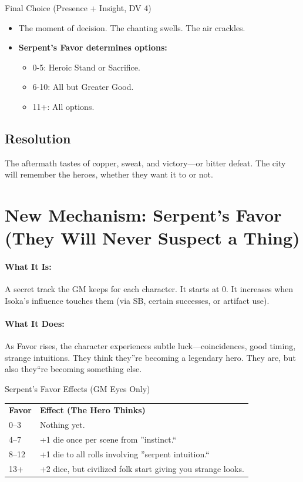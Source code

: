 \documentclass[11pt]{article}
\begin{document}
\begin{mechanicsbox}{Final Choice (Presence + Insight, DV 4)}
\begin{itemize}
    \item The moment of decision. The chanting swells. The air crackles.
    \item \textbf{Serpent's Favor determines options:}
    \begin{itemize}
        \item 0-5: Heroic Stand or Sacrifice.
        \item 6-10: All but Greater Good.
        \item 11+: All options.
    \end{itemize}
\end{itemize}
\end{mechanicsbox}

\subsection*{Resolution}
The aftermath tastes of copper, sweat, and victory---or bitter defeat. The city will remember the heroes, whether they want it to or not.

\section*{New Mechanism: Serpent's Favor (They Will Never Suspect a Thing)}

\paragraph{What It Is:}
A secret track the GM keeps for each character. It starts at 0. It increases when Isoka's influence touches them (via SB, certain successes, or artifact use).

\paragraph{What It Does:}
As Favor rises, the character experiences subtle luck---coincidences, good timing, strange intuitions. They think they''re becoming a legendary hero. They are, but also they``re becoming something else.

\begin{mechanicsbox}{Serpent's Favor Effects (GM Eyes Only)}
\begin{tabular}{ll}
\textbf{Favor} & \textbf{Effect (The Hero Thinks)} \\
0--3 & Nothing yet. \\
4--7 & +1 die once per scene from ''instinct.`` \\
8--12 & +1 die to all rolls involving ''serpent intuition.`` \\
13+ & +2 dice, but civilized folk start giving you strange looks.
\end{tabular}
\end{mechanicsbox}
\end{document}
